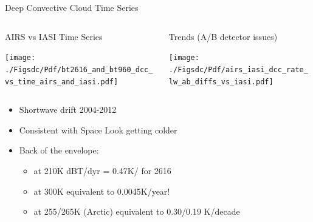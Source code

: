 \documentclass[10pt,t]{beamer}
\begin{document}
\begin{frame}[label={sec:org14a943c}]{Deep Convective Cloud Time Series}
\vspace{-0.35in}

\begin{columns}
\begin{column}{0.5\columnwidth}
\begin{block}{\footnotesize AIRS vs IASI Time Series}
\vspace{-0.1in}
\begin{center}
\texttt{[image: ./Figsdc/Pdf/bt2616\_and\_bt960\_dcc\_vs\_time\_airs\_and\_iasi.pdf]}
\end{center}
\end{block}
\end{column}

\begin{column}{0.5\columnwidth}
\begin{block}{\footnotesize Trends (A/B detector issues)}
\vspace{-0.1in}
\begin{center}
\texttt{[image: ./Figsdc/Pdf/airs\_iasi\_dcc\_rate\_lw\_ab\_diffs\_vs\_iasi.pdf]}
\end{center}
\end{block}
\end{column}
\end{columns}

\vspace{-0.1in}
\begin{footnotesize}
\begin{itemize}
\item Shortwave drift 2004-2012
\item Consistent with Space Look getting colder
\item Back of the envelope: 
\begin{itemize}
\item at 210K dBT/dyr = 0.47K/ for 2616 \wn
\item at 300K equivalent to 0.0045K/year!
\item at 255/265K (Arctic) equivalent to 0.30/0.19 K/decade
\end{itemize}
\end{itemize}

\end{footnotesize}
\end{frame}
\end{document}
